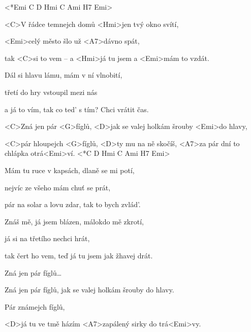 

<*Emi C D Hmi C Ami H7 Emi>

\zs
<C>V řádce temnejch domů <Hmi>jen tvý okno svítí,

<Emi>celý město šlo už <A7>dávno spát,

tak <C>si to vem – a <Hmi>já tu jsem a <Emi>mám to vzdát.
\ks

\zs
Dál si hlavu lámu, mám v ní vlnobití,

třetí do hry vstoupil mezi nás

a já to vím, tak co ted’ s tím?  Chci vrátit čas.
\ks

\zr
<C>Zná jen pár <G>fíglů,
<D>jak se valej holkám šrouby <Emi>do hlavy,

<C>pár hloupejch <G>fíglů,
<D>ty mu na ně skočíš, <A7>za pár dní to chlápka otrá<Emi>ví.
<*C D Hmi C Ami H7 Emi>
\kr

\zs
Mám tu ruce v kapsách, dlaně se mi potí,

nejvíc ze všeho mám chuť se prát,

pár na solar a lovu zdar, tak to bych zvlád'.
\ks

\zs
Znáš mě, já jsem blázen, málokdo mě zkrotí,

já si na třetího nechci hrát,

tak čert ho vem, teď já tu jsem jak žhavej drát.
\ks

\zr
Zná jen pár fíglů…
\kr

\zr
Zná jen pár fíglů,
jak se valej holkám šrouby do hlavy.

Pár známejch fíglů,

<D>já tu ve tmě házím <A7>zapálený sirky do trá<Emi>vy.
\kr

\kp
